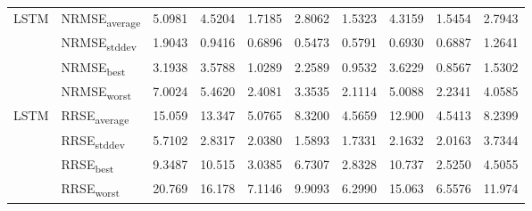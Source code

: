 {\begin{longtable}{l l c c c c c c c c}
\cmidrule(lr){2-10}
\multirow{4}{*}{LSTM} & NRMSE\textsubscript{average} & 5.0981 & 4.5204 & 1.7185 & 2.8062 & 1.5323 & 4.3159 & 1.5454 & 2.7943 \\
 & NRMSE\textsubscript{stddev} & 1.9043 & 0.9416 & 0.6896 & 0.5473 & 0.5791 & 0.6930 & 0.6887 & 1.2641 \\
 & NRMSE\textsubscript{best} & 3.1938 & 3.5788 & 1.0289 & 2.2589 & 0.9532 & 3.6229 & 0.8567 & 1.5302 \\
 & NRMSE\textsubscript{worst} & 7.0024 & 5.4620 & 2.4081 & 3.3535 & 2.1114 & 5.0088 & 2.2341 & 4.0585 \\
\cmidrule(lr){2-10}
\multirow{4}{*}{LSTM} & RRSE\textsubscript{average} & 15.059 & 13.347 & 5.0765 & 8.3200 & 4.5659 & 12.900 & 4.5413 & 8.2399 \\
 & RRSE\textsubscript{stddev} & 5.7102 & 2.8317 & 2.0380 & 1.5893 & 1.7331 & 2.1632 & 2.0163 & 3.7344 \\
 & RRSE\textsubscript{best} & 9.3487 & 10.515 & 3.0385 & 6.7307 & 2.8328 & 10.737 & 2.5250 & 4.5055 \\
 & RRSE\textsubscript{worst} & 20.769 & 16.178 & 7.1146 & 9.9093 & 6.2990 & 15.063 & 6.5576 & 11.974 \\
\cmidrule(lr){2-10}
\end{longtable}
}